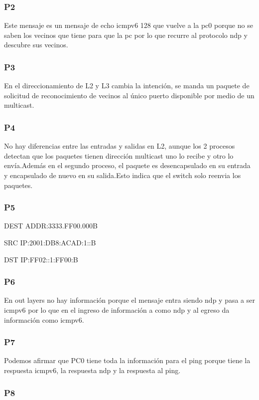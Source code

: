 \documentclass[]{article}
\begin{document}
	\subsubsection{\textbf{P2}}
	Este mensaje es un mensaje de echo icmpv6 128 que vuelve a la pc0 porque no se saben los vecinos que tiene para que la pc por lo que recurre al protocolo ndp y descubre sus vecinos.
	\subsubsection{\textbf{P3}}
	En el direccionamiento de L2 y L3 cambia la intención, se manda un paquete de solicitud de reconocimiento de vecinos al único puerto disponible por medio de un multicast.
	\subsubsection{\textbf{P4}}
	No hay diferencias entre las entradas y salidas en L2, aunque los 2 procesos detectan que los paquetes tienen dirección multicast uno lo recibe y otro lo envía.Además en el segundo proceso, el paquete es desencapsulado en su entrada y encapsulado de nuevo en su salida.Esto indica que el switch solo reenvia los paquetes.
	
	\subsubsection{\textbf{P5}}
	
	DEST ADDR:3333.FF00.000B
	
	SRC IP:2001:DB8:ACAD:1::B 
	
	DST IP:FF02::1:FF00:B
	
	\subsubsection{\textbf{P6}}
	
	En out layers no hay información porque el mensaje entra siendo ndp y pasa a ser icmpv6 por lo que en el ingreso de información a como ndp y al egreso da información como icmpv6.
	
	\subsubsection{\textbf{P7}}
	
	Podemos afirmar que PC0 tiene toda la información para el ping porque tiene la respuesta icmpv6, la respuesta ndp  y la respuesta al ping.
	
	\subsubsection{\textbf{P8}}
	
\end{document}
